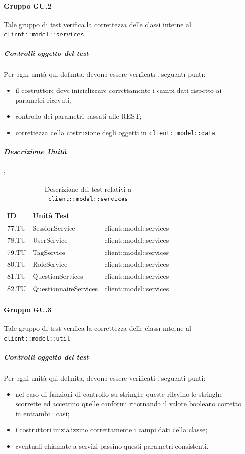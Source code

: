 \documentclass[12pt,a4paper]{article}
\begin{document}
\paragraph{Gruppo GU.2 }
Tale gruppo di test verifica la correttezza delle classi interne al  \texttt{client::model::services}
\subparagraph{Controlli oggetto del test}
Per ogni unità  qui definita, devono essere verificati i seguenti punti:
\begin{itemize}
	\item il costruttore deve inizializzare correttamente i campi dati rispetto ai parametri ricevuti;
	\item controllo dei parametri passati alle  REST;
	\item correttezza della costruzione degli oggetti in \texttt{client::model::data}.
\end{itemize}

\subparagraph{Descrizione Unità}:
\begin{table}[H]
	\begin{center}
		\begin{tabular}{p{} p{} p{}}
			\toprule
			\textbf{ID}   & \textbf{Unità Test}	& \textbf{\mgls{package}} \\ \midrule
			\midrule
			77.TU & SessionService & client::model::services\\ \midrule
			78.TU & UserService & client::model::services\\ \midrule
			79.TU & TagService & client::model::services\\ \midrule
			80.TU & RoleService & client::model::services\\ \midrule
			81.TU & QuestionServices & client::model::services\\ \midrule
			82.TU & QuestionnaireServices & client::model::services\\ \midrule
			\bottomrule
		\end{tabular}
	\end{center}
	\caption{Descrizione dei test relativi a \texttt{client::model::services}}
\end{table}
\paragraph{Gruppo GU.3}
Tale gruppo di test verifica la correttezza delle classi interne al  \texttt{client::model::util}
\subparagraph{Controlli oggetto del test}
Per ogni unità  qui definita, devono essere verificati i seguenti punti:
\begin{itemize}
	\item nel caso di funzioni di controllo su stringhe queste rilevino le stringhe scorrette ed accettino quelle conformi ritornando il valore booleano corretto in entrambi i casi;
	\item i costruttori inizializzino correttamente i campi dati della classe;
	\item eventuali chiamate a servizi passino  questi parametri consistenti.
\end{itemize}
\end{document}
